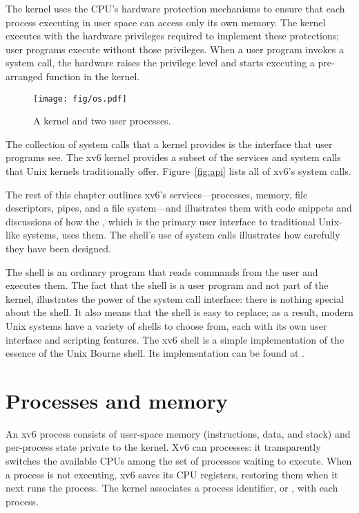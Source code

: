 The kernel uses the CPU's hardware protection mechanisms to
ensure that each process executing in user space can access only
its own memory.
The kernel executes with the hardware privileges required to
implement these protections; user programs execute without
those privileges.
When a user program invokes a system call, the hardware
raises the privilege level and starts executing a pre-arranged
function in the kernel.

\begin{figure}[t]
\center
\texttt{[image: fig/os.pdf]}
\caption{A kernel and two user processes.}
\label{fig:os}
\end{figure}

The collection of system calls that a kernel provides
is the interface that user programs see.
The xv6 kernel provides a subset of the services and system calls
that Unix kernels traditionally offer.  
Figure~\ref{fig:api} 
lists all of xv6's system calls.

The rest of this chapter outlines xv6's services---processes, memory,
file descriptors, pipes, and a file system---and illustrates them with
code snippets and discussions of how the , which is
the primary user interface to traditional Unix-like systems, uses
them. The shell's use of system calls illustrates how carefully they
have been designed.

The shell is an ordinary program that reads commands from the user
and executes them.
The fact that the shell is a user program and not part of the kernel,
illustrates the power of the system call interface: there is nothing
special about the shell.
It also means that the shell is easy to replace; as a result,
modern Unix systems have a variety of
shells to choose from, each with its own user interface
and scripting features.
The xv6 shell is a simple implementation of the essence of
the Unix Bourne shell.  Its implementation can be found at 
.
\section{Processes and memory}

An xv6 process consists of user-space memory (instructions, data, and stack)
and per-process state private to the kernel.
Xv6 can
processes: it transparently switches the available CPUs
among the set of processes waiting to execute.
When a process is not executing, xv6 saves its CPU registers,
restoring them when it next runs the process.
The kernel associates a process identifier, or
,
with each process.

